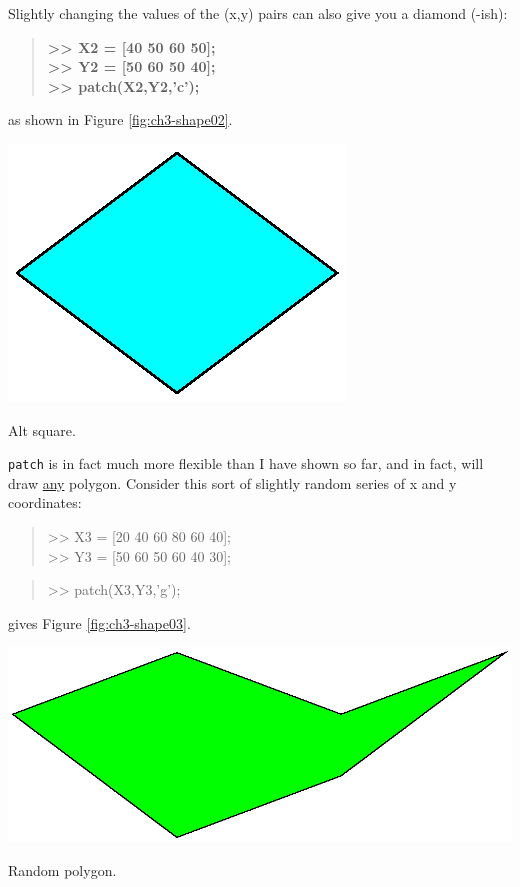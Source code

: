 \documentclass{tufte-book} %
\newenvironment{docspec}{\begin{quotation}\ttfamily\parskip0pt\parindent0pt\ignorespaces}{\end{quotation}}
\newenvironment{docspecbold}{\begin{quotation}\ttfamily\bfseries\parskip0pt\parindent0pt\ignorespaces}{\end{quotation}}
\begin{document}
Slightly changing the values of the (x,y) pairs can also give you a diamond (-ish):
\begin{docspecbold}
>> X2 = [40 50 60 50];\\
>> Y2 = [50 60 50 40];\\
>> patch(X2,Y2,'c');
\end{docspecbold}
as shown in Figure \ref{fig:ch3-shape02}.

\begin{marginfigure}[-1.0in]
\includegraphics[width=\linewidth]{ch3-shape02.eps}
\caption{Alt square.}
\label{fig:ch3-shape02}
\end{marginfigure}

\texttt{patch} is in fact much more flexible than I have shown so far, and in fact, will draw \uline{any} polygon. Consider this sort of slightly random series of x and y coordinates: 
\begin{docspec}
>> X3 = [20 40 60 80 60 40];\\
>> Y3 = [50 60 50 60 40 30];
\end{docspec}
\begin{docspec}
>> patch(X3,Y3,'g');
\end{docspec}
gives Figure \ref{fig:ch3-shape03}.

\begin{marginfigure}[-0.0in]
\includegraphics[width=\linewidth]{ch3-shape03.eps}
\caption{Random polygon.}
\label{fig:ch3-shape03}
\end{marginfigure}
\end{document}
